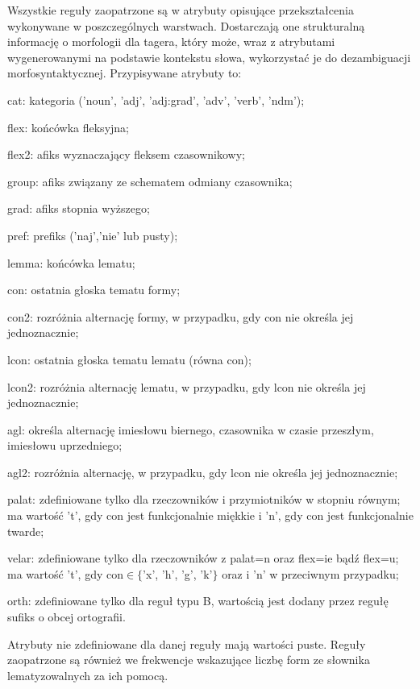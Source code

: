 \documentclass{article}
\begin{document}
Wszystkie reguły zaopatrzone są w atrybuty opisujące przekształcenia wykonywane w poszczególnych warstwach. 
Dostarczają one strukturalną informację o morfologii dla tagera, który może, wraz z atrybutami wygenerowanymi na podstawie kontekstu słowa, 
wykorzystać je do dezambiguacji morfosyntaktycznej.
Przypisywane atrybuty to:
\begin{description}
\item{cat:} kategoria ('noun', 'adj', 'adj:grad', 'adv', 'verb', 'ndm');
\item{flex:} końcówka fleksyjna;
\item{flex2:} afiks wyznaczający fleksem czasownikowy;
\item{group:} afiks związany ze schematem odmiany czasownika;
\item{grad:} afiks stopnia wyższego;
\item{pref:} prefiks ('naj','nie' lub pusty);
\item{lemma:} końcówka lematu;
\item{con:} ostatnia głoska tematu formy;
\item{con2:} rozróżnia alternację formy, w przypadku, gdy con nie określa jej jednoznacznie;
\item{lcon:} ostatnia głoska tematu lematu (równa con);
\item{lcon2:} rozróżnia alternację lematu, w przypadku, gdy lcon nie określa jej jednoznacznie;
\item{agl:} określa alternację imiesłowu biernego, czasownika w czasie przeszłym, imiesłowu uprzedniego;
\item{agl2:} rozróżnia alternację, w przypadku, gdy lcon nie określa jej jednoznacznie;
\item{palat:} zdefiniowane tylko dla rzeczowników i przymiotników w stopniu równym; ma wartość 't', gdy con jest funkcjonalnie miękkie i 'n', gdy con jest funkcjonalnie twarde;
\item{velar:} zdefiniowane tylko dla rzeczowników z palat=n oraz flex=ie bądź flex=u; ma wartość 't', gdy con$\in\{$'x', 'h', 'g', 'k'$\}$ oraz i 'n' w przeciwnym przypadku;
\item{orth:} zdefiniowane tylko dla reguł typu B, wartością jest dodany przez regułę sufiks o obcej ortografii.
\end{description}
Atrybuty nie zdefiniowane dla danej reguły mają wartości puste.
Reguły zaopatrzone są również we frekwencje wskazujące liczbę form ze słownika lematyzowalnych za ich pomocą.
\end{document}
